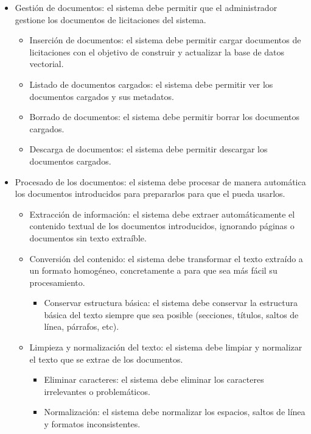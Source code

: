 \begin{itemize}
\tightlist
	\item {} Gestión de documentos: el sistema debe permitir que el administrador gestione los documentos de licitaciones del sistema. 
	\begin{itemize}
	\tightlist
		\item {} Inserción de documentos: el sistema debe permitir cargar documentos de licitaciones con el objetivo de construir y actualizar la base de datos vectorial.
		\item {} Listado de documentos cargados: el sistema debe permitir ver los documentos cargados y sus metadatos.
		\item {} Borrado de documentos: el sistema debe permitir borrar los documentos cargados.
		\item {} Descarga de documentos: el sistema debe permitir descargar los documentos cargados.
	\end{itemize}
	\item {} Procesado de los documentos: el sistema debe procesar de manera automática los documentos introducidos para prepararlos para que el  pueda usarlos.
	\begin{itemize}
	\tightlist
		\item {} Extracción de información: el sistema debe extraer automáticamente el contenido textual de los documentos introducidos, ignorando páginas o documentos sin texto extraíble.
		\item {} Conversión del contenido: el sistema debe transformar el texto extraído a un formato homogéneo, concretamente a  para que sea más fácil su procesamiento.
		\begin{itemize}
		\tightlist
			\item {} Conservar estructura básica: el sistema debe conservar la estructura básica del texto siempre que sea posible (secciones, títulos, saltos de línea, párrafos, etc).
		\end{itemize}
		\item {} Limpieza y normalización del texto: el sistema debe limpiar y normalizar el texto que se extrae de los documentos.
		\begin{itemize}
		\tightlist
			\item {} Eliminar caracteres: el sistema debe eliminar los caracteres irrelevantes o problemáticos.
			\item {} Normalización: el sistema debe normalizar los espacios, saltos de línea y formatos inconsistentes.

\end{itemize}
\end{itemize}
\end{itemize}
